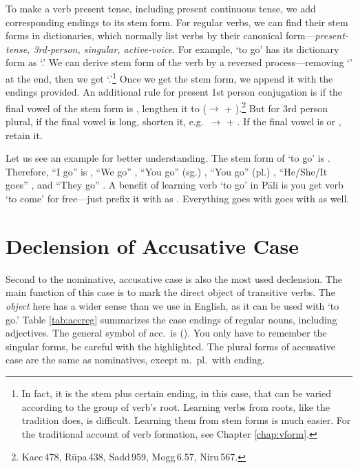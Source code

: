 To make a verb present tense, including present continuous tense, we add corresponding endings to its stem form. For regular verbs, we can find their stem forms in dictionaries, which normally list verbs by their canonical form---\emph{present-tense, 3rd-person, singular, active-voice}. For example, `to go' has its dictionary form as `.' We can derive stem form of the verb by a reversed process---removing `' at the end, then we get `.'\footnote{In fact, it is the stem plus certain ending,  in this case, that can be varied according to the group of verb's root. Learning verbs from roots, like the tradition does, is difficult. Learning them from stem forms is much easier. For the traditional account of verb formation, see Chapter \ref{chap:vform}.} Once we get the stem form, we append it with the endings provided. An additional rule for present 1st person conjugation is if the final vowel of the stem form is , lengthen it to  ($\rightarrow$ + ).\footnote{Kacc\,478, R\=upa\,438, Sadd\,959, Mogg\,6.57, Niru\,567.} But for 3rd person plural, if the final vowel is long, shorten it, e.g.\ $\rightarrow$ + . If the final vowel is  or , retain it.

Let us see an example for better understanding. The stem form of `to go' is . Therefore, ``I go'' is , ``We go'' , ``You go'' (sg.) , ``You go'' (pl.) , ``He/She/It goes'' , and ``They go'' . A benefit of learning verb `to go' in P\=ali is you get verb `to come' for free---just prefix it with  as . Everything goes with  goes with  as well.

{}
\section*{Declension of Accusative Case}

Second to the nominative, accusative case is also the most used declension. The main function of this case is to mark the direct object of transitive verbs. The \emph{object} here has a wider sense than we use in English, as it can be used with `to go.' Table \ref{tab:accreg} summarizes the case endings of regular nouns, including adjectives. The general symbol of acc.\ is  (). You only have to remember the singular forms, be careful with the highlighted. The plural forms of accusative case are the same as nominatives, except m.\ pl.\ with  ending.

